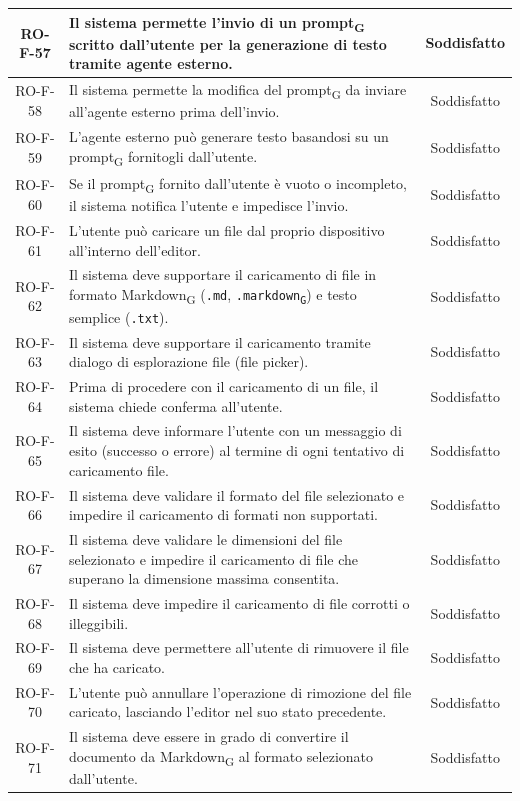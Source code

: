 \documentclass[11pt,a4paper]{article}
\newcommand{\gls}[1]{#1\textsubscript{G}}
\begin{document}
\begin{longtable}{|c|p{11cm}|c|}
\hline
RO-F-57 & Il sistema permette l'invio di un \gls{prompt} scritto dall'utente per la generazione di testo tramite agente esterno. & Soddisfatto \\
\hline
RO-F-58 & Il sistema permette la modifica del \gls{prompt} da inviare all'agente esterno prima dell'invio. & Soddisfatto \\
\hline
RO-F-59 & L'agente esterno può generare testo basandosi su un \gls{prompt} fornitogli dall'utente. & Soddisfatto \\
\hline
RO-F-60 & Se il \gls{prompt} fornito dall'utente è vuoto o incompleto, il sistema notifica l'utente e impedisce l'invio. & Soddisfatto \\
\hline
RO-F-61 & L'utente può caricare un file dal proprio dispositivo all'interno dell'editor. & Soddisfatto \\
\hline
RO-F-62 & Il sistema deve supportare il caricamento di file in formato \gls{Markdown} (\texttt{.md}, \texttt{.\gls{markdown}}) e testo semplice (\texttt{.txt}). & Soddisfatto \\
\hline
RO-F-63 & Il sistema deve supportare il caricamento tramite dialogo di esplorazione file (file picker). & Soddisfatto \\
\hline
RO-F-64 & Prima di procedere con il caricamento di un file, il sistema chiede conferma all'utente. & Soddisfatto \\
\hline
RO-F-65 & Il sistema deve informare l'utente con un messaggio di esito (successo o errore) al termine di ogni tentativo di caricamento file. & Soddisfatto \\
\hline
RO-F-66 & Il sistema deve validare il formato del file selezionato e impedire il caricamento di formati non supportati. & Soddisfatto \\
\hline
RO-F-67 & Il sistema deve validare le dimensioni del file selezionato e impedire il caricamento di file che superano la dimensione massima consentita. & Soddisfatto \\
\hline
RO-F-68 & Il sistema deve impedire il caricamento di file corrotti o illeggibili. & Soddisfatto \\
\hline
RO-F-69 & Il sistema deve permettere all'utente di rimuovere il file che ha caricato. & Soddisfatto \\
\hline
RO-F-70 & L'utente può annullare l'operazione di rimozione del file caricato, lasciando l'editor nel suo stato precedente. & Soddisfatto \\
\hline
RO-F-71 & Il sistema deve essere in grado di convertire il documento da \gls{Markdown} al formato selezionato dall'utente. & Soddisfatto \\

\end{longtable}
\end{document}
